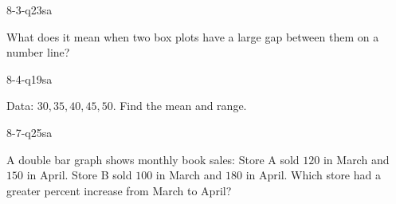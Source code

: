 \begin{practiceQuestion}{8-3-q23}{sa}
\begin{questionText}
What does it mean when two box plots have a large gap between them on a number line?
\end{questionText}
\end{practiceQuestion}

\begin{practiceQuestion}{8-4-q19}{sa}
\begin{questionText}
Data: $30, 35, 40, 45, 50$. Find the mean and range.
\end{questionText}
\end{practiceQuestion}

\begin{practiceQuestion}{8-7-q25}{sa}
\begin{questionText}
A double bar graph shows monthly book sales: Store A sold $120$ in March and $150$ in April. Store B sold $100$ in March and $180$ in April. Which store had a greater percent increase from March to April?
\end{questionText}
\end{practiceQuestion}

